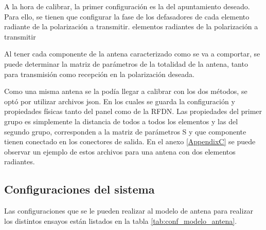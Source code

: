 A la hora de calibrar, la primer configuración es la del apuntamiento deseado. Para ello, se tienen que configurar la fase de 
los defasadores de cada elemento radiante de la polarización a transmitir.
elementos radiantes de la polarización a transmitir   





Al tener cada componente de la antena caracterizado como se va a comportar, se puede determinar la matriz de parámetros de la
totalidad de la antena, tanto para transmisión como recepción en la polarización deseada.


Como una misma antena se la podía llegar a calibrar con los dos métodos, se optó por utilizar archivos json. En los cuales 
se guarda la configuración y propiedades físicas tanto del panel como de la RFDN. Las propiedades del primer grupo es 
simplemente la distancia de todos a todos los elementos y las del segundo grupo, corresponden a la matriz de parámetros S y 
que componente tienen conectado en los conectores de salida. En el anexo \ref{AppendixC} se puede observar un ejemplo de estos archivos
para una antena con dos elementos radiantes.

\subsection{Configuraciones del sistema}

Las configuraciones que se le pueden realizar al modelo de antena para realizar los distintos ensayos están listados en la 
tabla \ref{tab:conf_modelo_antena}.

